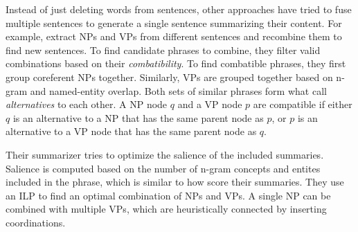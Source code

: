 \documentclass[a4paper,BCOR=10mm]{report}
\numberwithin{lemma}{chapter}
\numberwithin{definition}{chapter}
\begin{document}




Instead of just deleting words from sentences, other approaches have tried to fuse multiple sentences to generate a single sentence summarizing their content.
For example, \citet{bing} extract NPs and VPs from different sentences and recombine them to find new sentences.
To find candidate phrases to combine, they filter valid combinations based on their \textit{combatibility}. To find combatible phrases, they first group coreferent NPs together. Similarly, VPs are grouped together based on n-gram and named-entity overlap. Both sets of similar phrases form what \citeauthor{bing} call \textit{alternatives} to each other. A NP node $q$ and a VP node $p$ are compatible if either $q$ is an alternative to a NP that has the same parent node as $p$, or $p$ is an alternative to a VP node that has the same parent node as $q$.

Their summarizer tries to optimize the salience of the included summaries. Salience is computed based on the number of n-gram concepts and entites included in the phrase, which is similar to how \citet{berg-kirkpatrick} score their summaries.
They use an ILP to find an optimal combination of NPs and VPs.
A single NP can be combined with multiple VPs, which are heuristically connected by inserting coordinations.
\end{document}
